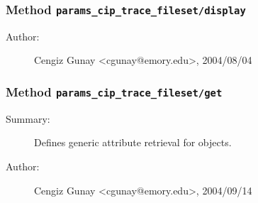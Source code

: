 \subsubsection[Method \texttt{display}]{Method \texttt{params\_cip\_trace\_fileset/display}}%
%
\label{ref_params_cip_trace_fileset__display}%
\hypertarget{ref_params_cip_trace_fileset__display}{}%
\begin{description}
%
%
%
%
%
%
%
\item[Author:]%
Cengiz Gunay <cgunay@emory.edu>, 2004/08/04%
\end{description}
\methodline%
\subsubsection[Method \texttt{get}]{Method \texttt{params\_cip\_trace\_fileset/get}}%
%
\label{ref_params_cip_trace_fileset__get}%
\hypertarget{ref_params_cip_trace_fileset__get}{}%
\begin{description}
\item[Summary:]Defines generic attribute retrieval for objects.
%
%
%
%
%
%
%
\item[Author:]%
Cengiz Gunay <cgunay@emory.edu>, 2004/09/14%
\end{description}
\methodline%
